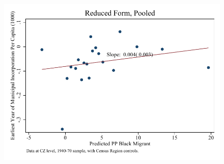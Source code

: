 \documentclass{article}
\begin{document}
\begin{figure}
\centering
\includegraphics{figures/simplefigs/pooled_cgoodman_pc_C3_rf.pdf}
\end{figure}
\clearpage
\end{document}
